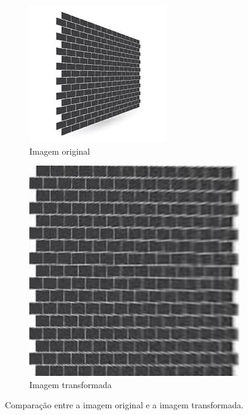 \documentclass[sigconf,nonacm]{acmart}
\begin{document}
\begin{figure}[H]
  \centering
  \begin{subfigure}[b]{0.45\linewidth}
    \centering
    \includegraphics[width=\linewidth]{../resources/input2.jpg}
    \caption{Imagem original}
    \label{fig:three}
  \end{subfigure}
  \hfill
  \begin{subfigure}[b]{0.45\linewidth}
    \centering
    \includegraphics[width=\linewidth]{../resources/output2.jpg}
    \caption{Imagem transformada}
    \label{fig:four}
  \end{subfigure}
  \caption{Comparação entre a imagem original e a imagem transformada.}
  \label{fig:resultados}
\end{figure}
\end{document}
